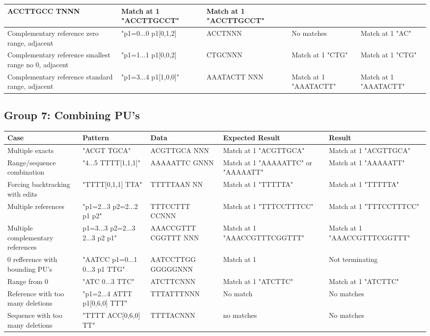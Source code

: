 \documentclass[12pt]{article}
\newcommand{\textapprox}{\raisebox{0.5ex}{\texttildelow}}
\newcommand{\pus}{PU's }
\begin{document}
\begin{appendices}
\begin{table}[H]
\begin{tabular}{p{4cm}|p{3cm}|p{2.5cm}|p{2.5cm}|p{2.5cm}}
ACCTTGCC TNNN & Match at 1 "ACCTTGCCT" & Match at 1 "ACCTTGCCT" \\ \hline
\rowcolor{lightred}
Complementary reference zero range, adjacent & "p1=0...0 \textapprox p1[0,1,2] & 
ACCTNNN & No matches & Match at 1 "AC" \\ \hline 
\rowcolor{lightgreen}
Complementary reference smallest range no 0, adjacent & "p1=1...1 \textapprox p1[0,0,2] & 
CTGCNNN & Match at 1 "CTG" & Match at 1 "CTG" \\ \hline
\rowcolor{lightgreen}
Complementary reference standard range, adjacent & "p1=3...4 \textapprox p1[1,0,0]" & AAATACTT NNN & Match at 1 "AAATACTT" & Match at 1 "AAATACTT" \\ \hline
\end{tabular}
\end{table}
\subsection{Group 7: Combining PU's}
\begin{table}[H]
\begin{tabular}{p{4cm}|p{3cm}|p{2.5cm}|p{2.5cm}|p{2.5cm}}
Case 			& Pattern & Data & Expected Result & Result \\ \hline
\rowcolor{lightgreen}
Multiple exacts 	& "ACGT TGCA" & ACGTTGCA NNN & Match at 1 "ACGTTGCA" & Match at 1 "ACGTTGCA"\\ \hline
\rowcolor{lightgreen}
Range/sequence combination& "4...5 TTTT[1,1,1]" & AAAAATTC GNNN & Match at 1 "AAAAATTC" or "AAAAATT" & 
Match at 1 "AAAAATT" \\ \hline
\rowcolor{lightgreen}
Forcing backtracking with edits & "TTTT[0,1,1] TTA" & TTTTTAAN NN & Match at 1 "TTTTTA" & Match at 1 "TTTTTA"\\ \hline
\rowcolor{lightgreen}
Multiple references & "p1=2...3 p2=2...2 p1 p2" & TTTCCTTT CCNNN & Match at 1 "TTTCCTTTCC" & Match at 1 "TTTCCTTTCC" \\ \hline
\rowcolor{lightgreen}
Multiple complementary references & p1=3...3 p2=2...3 2...3 \textapprox p2 \textapprox p1" & 
AAACCGTTT
CGGTTT NNN & Match at 1 "AAACCGTTTCGGTTT" & Match at 1 "AAACCGTTTCGGTTT" \\ \hline
\rowcolor{lightred}
0 refference with bounding \pus & "AATCC p1=0...1 0...3 p1 TTG" & AATCCTTGG
GGGGGNNN & Match at 1 & Not terminating\\ \hline
\rowcolor{lightgreen}
Range from 0 & "ATC 0...3 TTC" & ATCTTCNNN & Match at 1 "ATCTTC" & Match at 1 "ATCTTC" \\ \hline
\rowcolor{lightgreen}
Reference with too many deletions & "p1=2...4 ATTT p1[0,6,0] TTT" & TTTATTTNNN & No match & No matches \\ \hline
\rowcolor{lightgreen}
Sequence with too many deletions & "TTTT ACC[0,6,0] TT" & TTTTACNNN & no matches & No matches \\ \hline
\end{tabular}
\end{table} 
\end{appendices}
\end{document}
